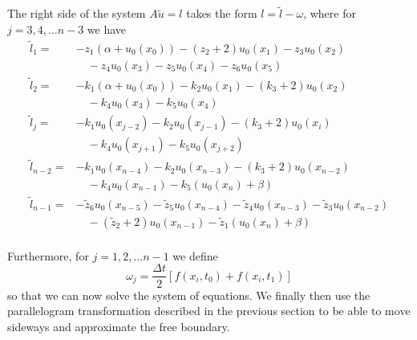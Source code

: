 \documentclass[00main.tex]{subfiles}
\begin{document}
The right side of the system $A \tilde{u} = l$ takes the form $l = \tilde{l}- \omega$, where for $j = 3,4,\hdots n-3$ we have \begin{align*}
\tilde{l}_1 =& -z_1 ( \alpha + u_0(x_{0})) - (z_2 +2) u_0(x_{1}) - z_3 u_0 (x_2)\\ & \quad - z_4 u_0( x_{3}) -z_5 u_0(x_{4}) - z_6 u_0(x_5)\\
\tilde{l}_2 =& -k_1 ( \alpha + u_0(x_{0})) - k_2 u_0(x_{1}) - (k_3+2) u_0 (x_2)\\ & \quad - k_4 u_0( x_{3}) -k_5 u_0(x_{4})\\
\tilde{l}_j =& -k_1 u_0(x_{j-2}) - k_2 u_0(x_{j-1}) - (k_3+2) u_0 (x_i)\\ & \quad - k_4 u_0( x_{j+1}) - k_5 u_0(x_{j+2})\\
\tilde{l}_{n-2} =& -k_1 u_0(x_{n-4}) - k_2 u_0(x_{n-3}) - (k_3+2) u_0 (x_{n-2})\\ & \quad - k_4 u_0( x_{n-1}) -k_5 ( u_0(x_{n}) + \beta) \\ 
\tilde{l}_{n-1} =& -\tilde{z}_6 u_0(x_{n-5}) - \tilde{z}_5 u_0(x_{n-4}) - \tilde{z}_4 u_0 (x_{n-3}) - \tilde{z}_3 u_0( x_{n-2})\\ & \quad - (\tilde{z}_2 +2) u_0 (x_{n-1}) - \tilde{z}_1 ( u_0(x_{n}) + \beta)\\
\end{align*}


Furthermore, for $j = 1,2, \hdots n-1$ we define \[ \omega_j = \frac{\Delta t}{2} \left[ f(x_i, t_0) + f(x_i, t_1) \right] \] so that we can now solve the system of equations. We finally then use the parallelogram transformation described in the previous section to be able to move sideways and approximate the free boundary.

\end{document}
